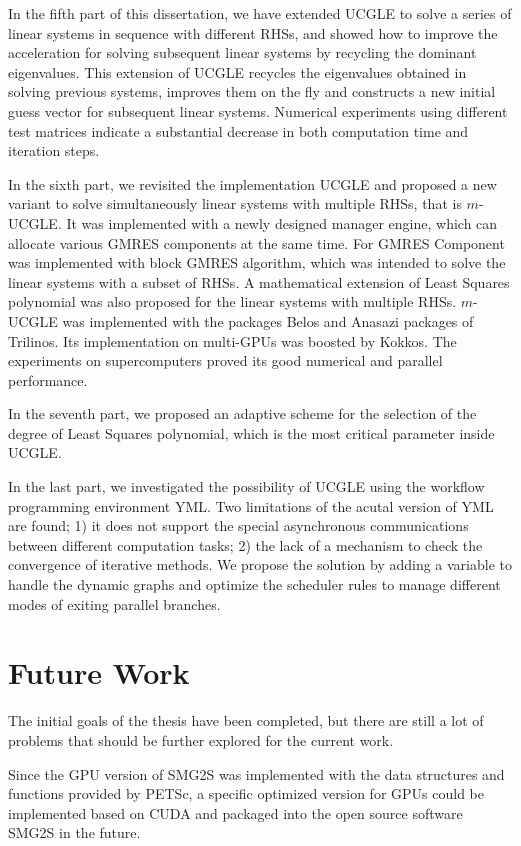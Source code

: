 In the fifth part of this dissertation, we have extended UCGLE to solve a series of linear systems in sequence with different RHSs, and showed how to improve the acceleration for solving subsequent linear systems by recycling the dominant eigenvalues. This extension of UCGLE recycles the eigenvalues obtained in solving previous systems, improves them on the fly and constructs a new initial guess vector for subsequent linear systems. Numerical experiments using different test matrices indicate a substantial decrease in both computation time and iteration steps.

In the sixth part, we revisited the implementation UCGLE and proposed a new variant to solve simultaneously linear systems with multiple RHSs, that is $m$-UCGLE. It was implemented with a newly designed manager engine, which can allocate various GMRES components at the same time. For GMRES Component was implemented with block GMRES algorithm, which was intended to solve the linear systems with a subset of RHSs. A mathematical extension of Least Squares polynomial was also proposed for the linear systems with multiple RHSs. $m$-UCGLE was implemented with the packages Belos and Anasazi packages of Trilinos. Its implementation on multi-GPUs was boosted by Kokkos. The experiments on supercomputers proved its good numerical and parallel performance.

In the seventh part, we proposed an adaptive scheme for the selection of the degree of Least Squares polynomial, which is the most critical parameter inside UCGLE.

In the last part, we investigated the possibility of UCGLE using the workflow programming environment YML. Two limitations of the acutal version of YML are found; 1) it does not support the special asynchronous communications between different computation tasks; 2) the lack of a mechanism to check the convergence of iterative methods. We propose the solution by adding a variable to handle the dynamic graphs and optimize the scheduler rules to manage different modes of exiting parallel branches. 

\section{Future Work}

The initial goals of the thesis have been completed, but there are still a lot of problems that should be further explored for the current work.

Since the GPU version of SMG2S was implemented with the data structures and functions provided by PETSc, a specific optimized version for GPUs could be implemented based on CUDA and packaged into the open source software SMG2S in the future.

